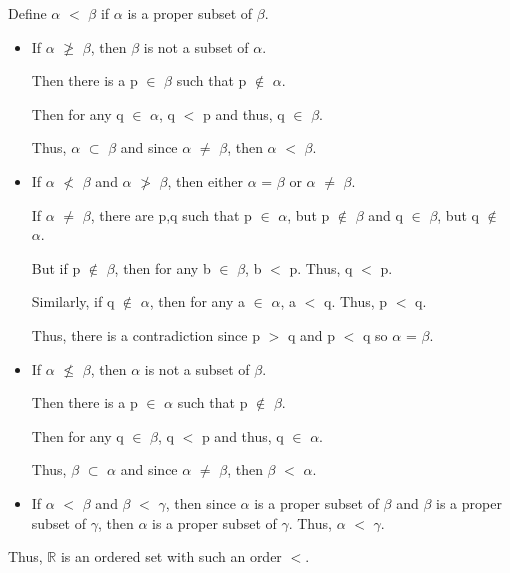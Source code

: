 	\begin{adjustbox}{minipage=16cm, right, vspace=0.1cm 0cm}
		Define $\alpha$ $<$ $\beta$ if $\alpha$ is a proper subset of $\beta$.

		\begin{itemize}[leftmargin=1cm, itemsep=0.1cm]
			\item If $\alpha$ $\not \geq$ $\beta$, then $\beta$ is not a subset of $\alpha$.

				Then there is a p $\in$ $\beta$ such that p $\not \in$ $\alpha$.

				Then for any q $\in$ $\alpha$, q $<$ p and thus, q $\in$ $\beta$.

				Thus, $\alpha$ $\subset$ $\beta$ and since $\alpha$ $\neq$ $\beta$,
				then $\alpha$ $<$ $\beta$.

			\item If $\alpha$ $\not <$ $\beta$ and $\alpha$ $\not >$ $\beta$,
				then either $\alpha$ = $\beta$ or $\alpha$ $\neq$ $\beta$.

				If $\alpha$ $\neq$ $\beta$, there are p,q such that
				p $\in$ $\alpha$, but p $\not \in$ $\beta$ and q $\in$ $\beta$,
				but q $\not \in$ $\alpha$.

				But if p $\not \in$ $\beta$, then for any b $\in$ $\beta$, b $<$ p.
				Thus, q $<$ p.

				Similarly, if q $\not \in$ $\alpha$, then for any a $\in$ $\alpha$,
				a $<$ q. Thus, p $<$ q.

				Thus, there is a contradiction since p $>$ q and p $<$ q so
				$\alpha$ = $\beta$.

			\item If $\alpha$ $\not \leq$ $\beta$, then $\alpha$ is not a subset of $\beta$.

				Then there is a p $\in$ $\alpha$ such that p $\not \in$ $\beta$.

				Then for any q $\in$ $\beta$, q $<$ p and thus, q $\in$ $\alpha$.

				Thus, $\beta$ $\subset$ $\alpha$ and since $\alpha$ $\neq$ $\beta$,
				then $\beta$ $<$ $\alpha$.

			\item If $\alpha$ $<$ $\beta$ and $\beta$ $<$ $\gamma$, then since
				$\alpha$ is a proper subset of $\beta$ and $\beta$ is a proper subset
				of $\gamma$, then $\alpha$ is a proper subset of $\gamma$.
				Thus, $\alpha$ $<$ $\gamma$.
		\end{itemize}

		Thus, $\mathbb{R}$ is an ordered set with such an order $<$. \\
	\end{adjustbox}

